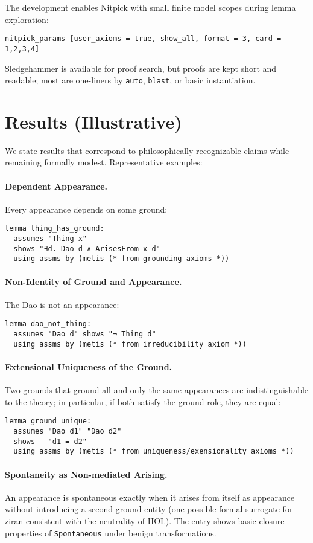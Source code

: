\documentclass[11pt,a4paper]{article}
\begin{document}
The development enables Nitpick with small finite model scopes during lemma
exploration:
\begin{lstlisting}
nitpick_params [user_axioms = true, show_all, format = 3, card = 1,2,3,4]
\end{lstlisting}
Sledgehammer is available for proof search, but proofs are kept short and
readable; most are one-liners by \texttt{auto}, \texttt{blast}, or basic
instantiation.

\section{Results (Illustrative)}

We state results that correspond to philosophically recognizable claims while
remaining formally modest. Representative examples:

\paragraph{Dependent Appearance.}
Every appearance depends on some ground:
\begin{lstlisting}
lemma thing_has_ground:
  assumes "Thing x"
  shows "∃d. Dao d ∧ ArisesFrom x d"
  using assms by (metis (* from grounding axioms *))
\end{lstlisting}

\paragraph{Non-Identity of Ground and Appearance.}
The Dao is not an appearance:
\begin{lstlisting}
lemma dao_not_thing:
  assumes "Dao d" shows "¬ Thing d"
  using assms by (metis (* from irreducibility axiom *))
\end{lstlisting}

\paragraph{Extensional Uniqueness of the Ground.}
Two grounds that ground all and only the same appearances are indistinguishable
to the theory; in particular, if both satisfy the ground role, they are equal:
\begin{lstlisting}
lemma ground_unique:
  assumes "Dao d1" "Dao d2"
  shows   "d1 = d2"
  using assms by (metis (* from uniqueness/exensionality axioms *))
\end{lstlisting}

\paragraph{Spontaneity as Non-mediated Arising.}
An appearance is spontaneous exactly when it arises from itself as appearance
without introducing a second ground entity (one possible formal surrogate for
ziran consistent with the neutrality of HOL). The entry shows basic closure
properties of \texttt{Spontaneous} under benign transformations.
\end{document}
